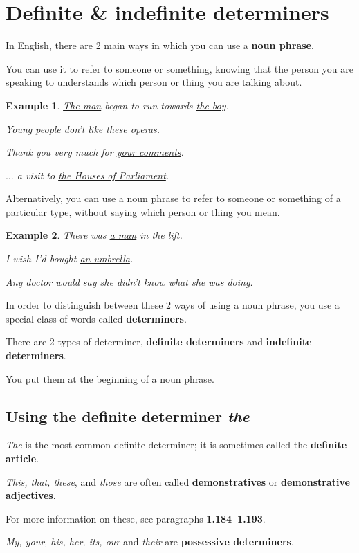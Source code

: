 \documentclass[oneside]{book}
\numberwithin{equation}{section}
\newtheorem{example}{Example}[section]
\begin{document}
\section{Definite \& indefinite determiners}
\noindent{} In English, there are 2 main ways in which you can use a \textbf{noun phrase}.

You can use it to refer to someone or something, knowing that the person you are speaking to understands which person or thing you are talking about.
\begin{example}
    \underline{The man} began to run towards \underline{the boy}.
    
    Young people don't like \underline{these operas}.
    
    Thank you very much for \underline{your comments}.
    
    $\ldots$ a visit to \underline{the Houses of Parliament}.
\end{example}
Alternatively, you can use a noun phrase to refer to someone or something of a particular type, without saying which person or thing you mean.
\begin{example}
    There was \underline{a man} in the lift.
    
    I wish I'd bought \underline{an umbrella}.
    
    \underline{Any doctor} would say she didn't know what she was doing.
\end{example}
In order to distinguish between these 2 ways of using a noun phrase, you use a special class of words called \textbf{determiners}.

There are 2 types of determiner, \textbf{definite determiners} and \textbf{indefinite determiners}.

You put them at the beginning of a noun phrase.

\subsection{Using the definite determiner \textit{the}}
\noindent{} \textit{The} is the most common definite determiner; it is sometimes called the \textbf{definite article}.

%
\textit{This, that, these}, and \textit{those} are often called \textbf{demonstratives} or \textbf{demonstrative adjectives}.

For more information on these, see paragraphs \textbf{1.184--1.193}.

%
\textit{My, your, his, her, its, our} and \textit{their} are \textbf{possessive determiners}.
\end{document}
